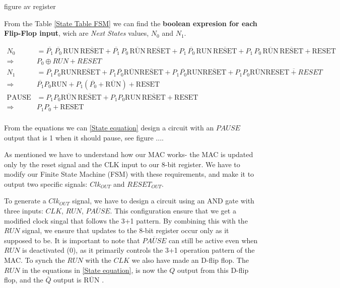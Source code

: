 figure av register

From the Table \ref{State Table FSM} we can find the \textbf{boolean expresion for each Flip-Flop input}, wich are \emph{Next States} values, $N_{0}$ and $N_{1}$. 

\begin{equation} 
    \label{State equation}
    \begin{aligned}
    N_{0}&= \overline{P_{1}} \, \overline{P_{0}} \, \text{RUN} \, \overline{\text{RESET}} + \overline{P_{1}} \, P_{0} \, \overline{\text{RUN}} \, \overline{\text{RESET}} + P_{1} \, \overline{P_{0}} \, \text{RUN} \, \overline{\text{RESET}} + P_{1} \, P_{0} \, \overline{\text{RUN}} \, \overline{\text{RESET}} + \text{RESET}\\
    \Rightarrow&P_{0}\oplus RUN+ RESET\\
    N_{1}&= \overline{P_{1}} P_{0} \text{RUN} \overline{\text{RESET}} + P_{1} \overline{P_{0}} \overline{\text{RUN}} \overline{\text{RESET}} + P_{1} \overline{P_{0}} \text{RUN} \overline{\text{RESET}} + P_{1} P_{0} \overline{\text{RUN}} \overline{\text{RESET}+ RESET}\\
    \Rightarrow&\overline{P_{1}} P_{0} \text{RUN} + P_{1}(\overline{P_{0}} + \overline{\text{RUN}}) + \text{RESET}\\
    \text{PAUSE}&= P_{1} P_{0} \overline{\text{RUN}} \, \overline{\text{RESET}} + P_{1} P_{0} \text{RUN} \, \overline{\text{RESET}} + \text{RESET}\\
    \Rightarrow&P_{1} P_{0}+\text{RESET}\\
    \end{aligned}
\end{equation}

From the equations we can \ref{State equation} design a circuit with an $PAUSE$ output that is 1 when it should pause,  see figure ....



As mentioned we have to understand how our MAC works- the MAC is updated only by the reset signal and the CLK input to our 8-bit register. We have to modify our Finite State Machine (FSM) with these requirements, and make it to output two specific signals: $Clk_{OUT}$ and $RESET_{OUT}$. 

To generate a $Clk_{OUT}$ signal, we have to design a circuit using an AND gate with three inputs: $CLK$, $RUN$, $\overline{PAUSE}$. This configuration  ensure that we get a  modified clock singal that follows the 3+1 pattern. By combining this with the $RUN$ signal, we ensure that updates to the 8-bit register occur only as it supposed to be. It is important to note that $\overline{PAUSE}$ can still be active even when $RUN$ is deactivated (0), as it primarily controls the 3+1 operation pattern of the MAC. To synch the $RUN$ with the $CLK$ we also have made an D-flip flop. The $RUN$ in the equations in \ref{State equation}, is now the $Q$ output from this D-flip flop, and the $\overline{Q}$ output is $\overline{\text{RUN}}$  .


